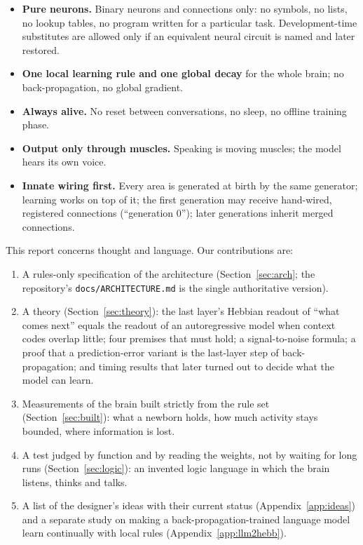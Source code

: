 \documentclass[11pt]{article}
\begin{document}
\begin{itemize}
\item \textbf{Pure neurons.} Binary neurons and connections only: no symbols, no lists, no lookup tables, no program
written for a particular task. Development-time substitutes are allowed only if an equivalent neural circuit is named
and later restored.
\item \textbf{One local learning rule and one global decay} for the whole brain; no back-propagation, no global
gradient.
\item \textbf{Always alive.} No reset between conversations, no sleep, no offline training phase.
\item \textbf{Output only through muscles.} Speaking is moving muscles; the model hears its own voice.
\item \textbf{Innate wiring first.} Every area is generated at birth by the same generator; learning works on top of it;
the first generation may receive hand-wired, registered connections (``generation 0''); later generations inherit
merged connections.
\end{itemize}

This report concerns thought and language. Our contributions are:

\begin{enumerate}
\item A rules-only specification of the architecture (Section~\ref{sec:arch}; the repository's
\texttt{docs/ARCHITECTURE.md} is the single authoritative version).
\item A theory (Section~\ref{sec:theory}): the last layer's Hebbian readout of ``what comes next'' equals the readout of
an autoregressive model when context codes overlap little; four premises that must hold; a signal-to-noise formula; a
proof that a prediction-error variant is the last-layer step of back-propagation; and timing results that later turned
out to decide what the model can learn.
\item Measurements of the brain built strictly from the rule set (Section~\ref{sec:built}): what a newborn holds, how
much activity stays bounded, where information is lost.
\item A test judged by function and by reading the weights, not by waiting for long runs (Section~\ref{sec:logic}):
an invented logic language in which the brain listens, thinks and talks.
\item A list of the designer's ideas with their current status (Appendix~\ref{app:ideas}) and a separate study on making
a back-propagation-trained language model learn continually with local rules (Appendix~\ref{app:llm2hebb}).
\end{enumerate}
\end{document}
